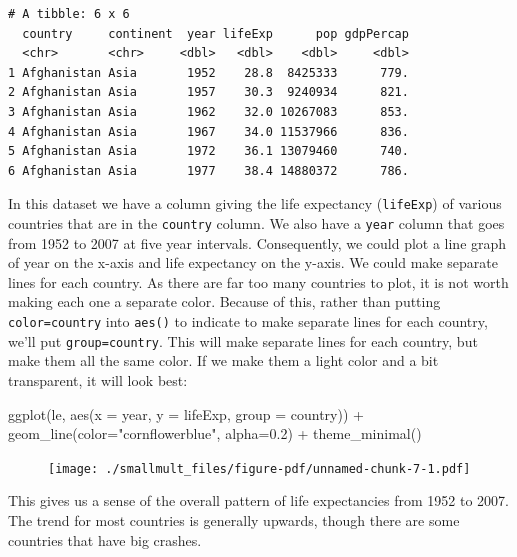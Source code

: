 \documentclass[
  letterpaper,
  DIV=11,
  numbers=noendperiod]{scrreprt}
\newenvironment{Shaded}{\begin{snugshade}}{\end{snugshade}}
\newcommand{\AttributeTok}[1]{\textcolor[rgb]{0.40,0.45,0.13}{#1}}
\newcommand{\FloatTok}[1]{\textcolor[rgb]{0.68,0.00,0.00}{#1}}
\newcommand{\FunctionTok}[1]{\textcolor[rgb]{0.28,0.35,0.67}{#1}}
\newcommand{\NormalTok}[1]{\textcolor[rgb]{0.00,0.23,0.31}{#1}}
\newcommand{\SpecialCharTok}[1]{\textcolor[rgb]{0.37,0.37,0.37}{#1}}
\newcommand{\StringTok}[1]{\textcolor[rgb]{0.13,0.47,0.30}{#1}}
\begin{document}
\begin{verbatim}
# A tibble: 6 x 6
  country     continent  year lifeExp      pop gdpPercap
  <chr>       <chr>     <dbl>   <dbl>    <dbl>     <dbl>
1 Afghanistan Asia       1952    28.8  8425333      779.
2 Afghanistan Asia       1957    30.3  9240934      821.
3 Afghanistan Asia       1962    32.0 10267083      853.
4 Afghanistan Asia       1967    34.0 11537966      836.
5 Afghanistan Asia       1972    36.1 13079460      740.
6 Afghanistan Asia       1977    38.4 14880372      786.
\end{verbatim}

In this dataset we have a column giving the life expectancy
(\texttt{lifeExp}) of various countries that are in the \texttt{country}
column. We also have a \texttt{year} column that goes from 1952 to 2007
at five year intervals. Consequently, we could plot a line graph of year
on the x-axis and life expectancy on the y-axis. We could make separate
lines for each country. As there are far too many countries to plot, it
is not worth making each one a separate color. Because of this, rather
than putting \texttt{color=country} into \texttt{aes()} to indicate to
make separate lines for each country, we'll put \texttt{group=country}.
This will make separate lines for each country, but make them all the
same color. If we make them a light color and a bit transparent, it will
look best:

\begin{Shaded}
\begin{Highlighting}[]
\FunctionTok{ggplot}\NormalTok{(le, }\FunctionTok{aes}\NormalTok{(}\AttributeTok{x =}\NormalTok{ year, }\AttributeTok{y =}\NormalTok{ lifeExp, }\AttributeTok{group =}\NormalTok{ country)) }\SpecialCharTok{+} 
  \FunctionTok{geom\_line}\NormalTok{(}\AttributeTok{color=}\StringTok{"cornflowerblue"}\NormalTok{, }\AttributeTok{alpha=}\FloatTok{0.2}\NormalTok{) }\SpecialCharTok{+}
  \FunctionTok{theme\_minimal}\NormalTok{()}
\end{Highlighting}
\end{Shaded}

\begin{figure}[H]

{\centering \texttt{[image: ./smallmult\_files/figure-pdf/unnamed-chunk-7-1.pdf]}

}

\end{figure}

This gives us a sense of the overall pattern of life expectancies from
1952 to 2007. The trend for most countries is generally upwards, though
there are some countries that have big crashes.
\end{document}
